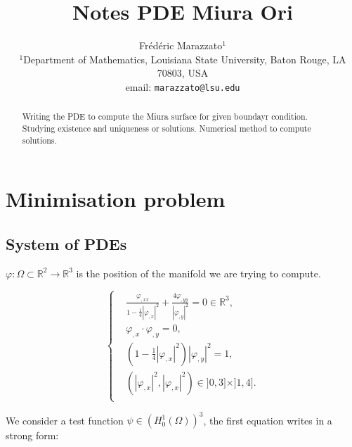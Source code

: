 

\title{Notes PDE Miura Ori}
\author{\begin{minipage}{\textwidth}\centering Fr\'ed\'eric
Marazzato$^{1}$\\
   \small{$^{1}$Department of Mathematics, Louisiana State University, Baton Rouge, LA 70803, USA}\\
   \small{email: \texttt{marazzato@lsu.edu}}\end{minipage}}
      
   


\maketitle

\begin{abstract}
Writing the PDE to compute the Miura surface for given boundayr condition. Studying existence and uniqueness or solutions. Numerical method to compute solutions.
\end{abstract}

\section{Minimisation problem}

\subsection{System of PDEs}

$\varphi : \Omega \subset \mathbb{R}^2 \rightarrow \mathbb{R}^3$ is the position of the manifold we are trying to compute.

\begin{equation}
\label{eq:strong form equations}
\left\{
\begin{aligned}
& \frac{\varphi_{,xx}}{1 - \frac14 |\varphi_{,x}|^2} + \frac{4\varphi_{,yy}}{|\varphi_{,y}|^2} = 0 \in \mathbb{R}^3,\\
&  \varphi_{,x} \cdot \varphi_{,y}  = 0, \\
& (1 - \frac14 |\varphi_{,x}|^2) |\varphi_{,y}|^2 = 1, \\
& (|\varphi_{,x}|^2, |\varphi_{,x}|^2) \in ]0,3]\times ]1,4]. \\
\end{aligned}
\right.
\end{equation}

We consider a test function $\psi \in \left(H^1_0(\Omega) \right)^3$, the first equation writes in a strong form:

